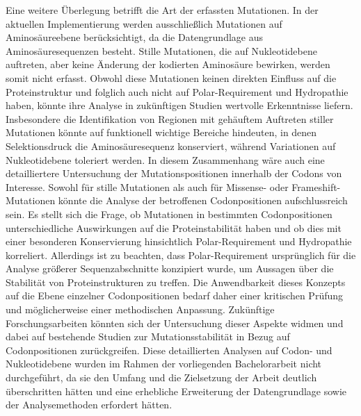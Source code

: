 \documentclass[german,version-2022-01]{uzl-thesis}
\begin{document}
Eine weitere \"Uberlegung betrifft die Art der erfassten Mutationen. In der aktuellen Implementierung werden ausschlie\ss{}lich Mutationen auf Aminos\"aureebene ber\"ucksichtigt, da die Datengrundlage aus Aminos\"auresequenzen besteht. Stille Mutationen, die auf Nukleotidebene auftreten, aber keine \"Anderung der kodierten Aminos\"aure bewirken, werden somit nicht erfasst. Obwohl diese Mutationen keinen direkten Einfluss auf die Proteinstruktur und folglich auch nicht auf Polar-Requirement und Hydropathie haben, k\"onnte ihre Analyse in zuk\"unftigen Studien wertvolle Erkenntnisse liefern. Insbesondere die Identifikation von Regionen mit geh\"auftem Auftreten stiller Mutationen k\"onnte auf funktionell wichtige Bereiche hindeuten, in denen Selektionsdruck die Aminos\"auresequenz konserviert, w\"ahrend Variationen auf Nukleotidebene toleriert werden. In diesem Zusammenhang w\"are auch eine detailliertere Untersuchung der Mutationspositionen innerhalb der Codons von Interesse. Sowohl f\"ur stille Mutationen als auch f\"ur Missense- oder Frameshift-Mutationen k\"onnte die Analyse der betroffenen Codonpositionen aufschlussreich sein. Es stellt sich die Frage, ob Mutationen in bestimmten Codonpositionen unterschiedliche Auswirkungen auf die Proteinstabilit\"at haben und ob dies mit einer besonderen Konservierung hinsichtlich Polar-Requirement und Hydropathie korreliert. Allerdings ist zu beachten, dass Polar-Requirement urspr\"unglich f\"ur die Analyse gr\"o\ss{}erer Sequenzabschnitte konzipiert wurde, um Aussagen \"uber die Stabilit\"at von Proteinstrukturen zu treffen. Die Anwendbarkeit dieses Konzepts auf die Ebene einzelner Codonpositionen bedarf daher einer kritischen Pr\"ufung und m\"oglicherweise einer methodischen Anpassung. Zuk\"unftige Forschungsarbeiten k\"onnten sich der Untersuchung dieser Aspekte widmen und dabei auf bestehende Studien zur Mutationsstabilit\"at in Bezug auf Codonpositionen zur\"uckgreifen. Diese detaillierten Analysen auf Codon- und Nukleotidebene wurden im Rahmen der vorliegenden Bachelorarbeit nicht durchgef\"uhrt, da sie den Umfang und die Zielsetzung der Arbeit deutlich \"uberschritten h\"atten und eine erhebliche Erweiterung der Datengrundlage sowie der Analysemethoden erfordert h\"atten.
\end{document}
